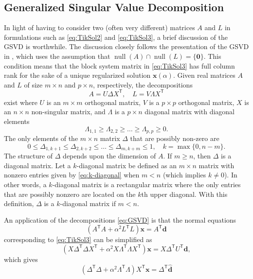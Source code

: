 \documentclass[12pt]{article}
\newcommand{\dVec}{\mathbf{d}}	%
\newcommand{\xVec}{\mathbf{x}}	%
\newcommand{\trans}[1]{{#1}^\mathsf{T}}	%
\DeclareMathOperator{\nullspace}{null}	%
\newcommand{\regparam}{\alpha}
\newcommand{\zeroVec}{\bm{0}}	%
\newcommand{\svd}[1]{\widehat{#1}}	%
\begin{document}
\subsection{Generalized Singular Value Decomposition} \label{sec:GSVD}
In light of having to consider two (often very different) matrices $A$ and $L$ in formulations such as \eqref{eq:TikSol2} and \eqref{eq:TikSol3}, a brief discussion of the GSVD is worthwhile. The discussion closely follows the presentation of the GSVD in \cite{ABT}, which uses the assumption that $\nullspace(A) \cap \nullspace(L) = \{\zeroVec\}$. This condition means that the block system matrix in \eqref{eq:TikSol3} has full column rank for the sake of a unique regularized solution $\xVec(\regparam)$. Given real matrices $A$ and $L$ of size $m \times n$ and $p \times n$, respectively, the decompositions
\begin{equation}
\label{eq:GSVD}
A = U\Delta\trans{X}, \quad L = V\Lambda\trans{X}
\end{equation}
exist where $U$ is an $m \times m$ orthogonal matrix, $V$ is a $p \times p$ orthogonal matrix, $X$ is an $n \times n$ non-singular matrix, and $\Lambda$ is a $p \times n$ diagonal matrix with diagonal elements
\[\Lambda_{1,1} \geq \Lambda_{2,2} \geq \ldots \geq \Lambda_{p,p} \geq 0.\]
The only elements of the $m \times n$ matrix $\Delta$ that are possibly non-zero are
\begin{equation}
\label{eq:k-diagonal}
 0 \leq \Delta_{1,k+1} \leq \Delta_{2,k+2} \leq \ldots \leq \Delta_{m,k+m} \leq 1, \quad k = \max \{0,n-m\}.
\end{equation}
The structure of $\Delta$ depends upon the dimension of $A$. If $m \geq n$, then $\Delta$ is a diagonal matrix. Let a $k$-diagonal matrix be defined as an $m \times n$ matrix with nonzero entries given by \eqref{eq:k-diagonal} when $m < n$ (which implies $k \neq 0$). In other words, a $k$-diagonal matrix is a rectangular matrix where the only entries that are possibly nonzero are located on the $k$th upper diagonal. With this definition, $\Delta$ is a $k$-diagonal matrix if $m < n$. \par 
An application of the decompositions \eqref{eq:GSVD} is that the normal equations 
\[(\trans{A}A + \regparam^2 \trans{L}L)\xVec = \trans{A}\dVec\] corresponding to \eqref{eq:TikSol3} can be simplified as 
\[(X\trans{\Delta}\Delta\trans{X} + \regparam^2 X\trans{\Lambda}\Lambda\trans{X})\xVec = X\trans{\Delta}\trans{U}\dVec,\]
which gives 
\[(\trans{\Delta}\Delta + \regparam^2 \trans{\Lambda}\Lambda)\trans{X}\xVec = \trans{\Delta}\svd{\dVec}\] 
\end{document}
